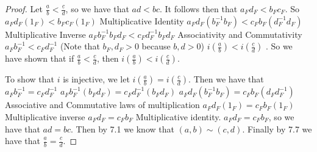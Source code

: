 \documentclass[12pt]{article}
\newcommand{\fr}[2]{\frac{\underline{#1}}{#2}}
\renewcommand{\_}[1]{\underline{ #1 }}
\theoremstyle{definition}
\numberwithin{equation}{subsection}
\begin{document}
\begin{proof}
Let $\fr{a}{b} < \fr{c}{d}$, so we have that $ad < bc$. It follows then that $a_Fd_F < b_Fc_F$. So \newline
$a_Fd_F(1_F) < b_Fc_F(1_F)$ Multiplicative Identity \newline
$a_Fd_F(b_F^{-1}b_F) < c_Fb_F(d_F^{-1}d_F)$ Multiplicative Inverse \newline
$a_Fb_F^{-1}b_Fd_F < c_Fd_F^{-1}b_Fd_F$ Associativity and Commutativity \newline
$a_Fb_F^{-1} < c_Fd_F^{-1}$ (Note that $b_F,d_F > 0$ because $b,d > 0$) \newline
$i(\fr{a}{b}) < i(\fr{c}{d})$ \newline. 
So we have shown that if $\fr{a}{b} < \fr{c}{d}$, then $i(\fr{a}{b}) < i(\fr{c}{d})$. \newline


To show that $i$ is injective, we let $i(\fr{a}{b}) = i(\fr{c}{d})$. Then we have that \newline
$a_Fb_F^{-1} = c_Fd_F^{-1}$ \newline
$a_Fb_F^{-1}(b_Fd_F) = c_Fd_F^{-1}(b_Fd_F)$ \newline
$a_Fd_F(b_F^{-1}b_F) = c_Fb_F(d_Fd_F^{-1})$ Associative and Commutative laws of multiplication \newline
$a_Fd_F(1_F) = c_Fb_F(1_F)$ Multiplicative inverse \newline
$a_Fd_F = c_Fb_F$ Multiplicative identity. \newline
$a_Fd_F = c_Fb_F$, so we have that $ad = bc$. Then by 7.1 we know that $(a,b) \sim (c,d)$. Finally by 7.7 we have that $\fr{a}{b} = \fr{c}{d}$.
\end{proof}
\end{document}
